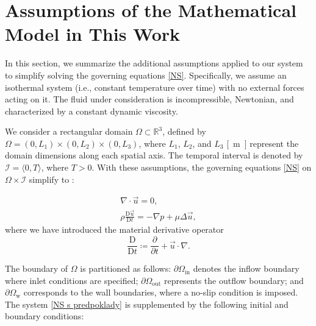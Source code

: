 \section{Assumptions of the Mathematical Model in This Work}\label{pred}
In this section, we summarize the additional assumptions applied to our system to simplify solving the governing equations \eqref{NS}. Specifically, we assume an isothermal system (i.e., constant temperature over time) with no external forces acting on it. The fluid under consideration is incompressible, Newtonian, and characterized by a constant dynamic viscosity.

We consider a rectangular domain $ \Omega \subset \mathbb{R}^3 $, defined by $ \Omega = (0, L_1) \times (0, L_2) \times (0, L_3) $, where $ L_1 $, $ L_2 $, and $ L_3 $ \si{[m]} represent the domain dimensions along each spatial axis. The temporal interval is denoted by $ \mathcal{I} = \langle 0, T \rangle $, where $ T > 0 $. With these assumptions, the governing equations \eqref{NS} on $ \Omega \times \mathcal{I} $ simplify to \cite{Schlichting}:

\begin{subequations}\label{NS s predpoklady}
	\begin{gather}
		\label{a s predpoklady}
		\nabla \cdot \vec{u} = 0, \\[5pt]
		\label{b s predpoklady}
		\rho \frac{\text{D} \vec{u}}{\text{D} t} = - \nabla p + \mu \Delta \vec{u},
	\end{gather}
\end{subequations}
where we have introduced the material derivative operator
\begin{equation}
	\dfrac{\text{D}}{\text{D} t} \coloneqq \dfrac{\partial}{\partial t} + \vec{u} \cdot \nabla.
\end{equation}

The boundary of $ \Omega $ is partitioned as follows: $ \partial \Omega_{\text{in}} $ denotes the inflow boundary where inlet conditions are specified; $ \partial \Omega_{\text{out}} $ represents the outflow boundary; and $ \partial \Omega_{\text{w}} $ corresponds to the wall boundaries, where a no-slip condition is imposed. The system \eqref{NS s predpoklady} is supplemented by the following initial and boundary conditions:

